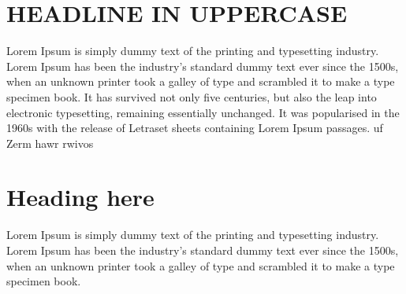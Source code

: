 \documentclass[final]{beamer}
\author{
  \small FirstName, LastName \\
  \footnotesize{first.last@helsinki.fi}, \\Department of Computer Science, \\University of Helsinki
  \and
  \small FirstName2, LastName2 \\
  \footnotesize{first.last@helsinki.fi}, \\Department of Computer Science, \\University of Helsinki}
\begin{document}
\begin{poster}



\newcolumn
\section{HEADLINE IN UPPERCASE}
\justifying
Lorem Ipsum is simply dummy text of the printing and typesetting industry. Lorem Ipsum has been the industry's standard dummy text ever since the 1500s, when an unknown printer took a galley of type and scrambled it to make a type specimen book. It has survived not only five centuries, but also the leap into electronic typesetting, remaining essentially unchanged. It was popularised in the 1960s with the release of Letraset sheets containing Lorem Ipsum passages. uf Zerm hawr rwivos


\section{Heading here}
\justifying
Lorem Ipsum is simply dummy text of the printing and typesetting industry. Lorem Ipsum has been the industry's standard dummy text ever since the 1500s, when an unknown printer took a galley of type and scrambled it to make a type specimen book. 


\end{poster}
\end{document}
